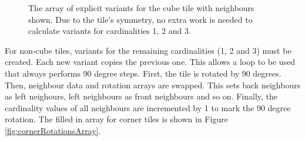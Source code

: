 \begin{figure}[H]
{\begin{minipage}[b]{0.22\linewidth}
        \end{minipage}
        \label{fig:cubeRotationsArray3}
    }
    \caption{The array of explicit variants for the cube tile with neighbours shown. Due to the tile's symmetry, no extra work is needed to calculate variants for cardinalities 1, 2 and 3.}
    \label{fig:cubeRotationsArray}
\end{figure}

For non-cube tiles, variants for the remaining cardinalities (1, 2 and 3) must be created. Each new variant copies the previous one. This allows a loop to be used that always performs 90 degree steps. First, the tile is rotated by 90 degrees. Then, neighbour data and rotation arrays are swapped. This sets back neighbours as left neighours, left neighbours as front neighbours and so on. Finally, the cardinality values of all neighbours are incremented by 1 to mark the 90 degree rotation. The filled in array for corner tiles is shown in Figure \ref{fig:cornerRotationsArray}.

